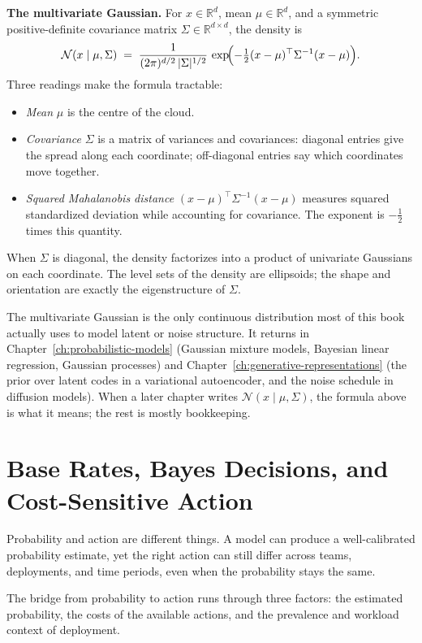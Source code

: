 \textbf{The multivariate Gaussian.} For \(x \in \mathbb{R}^d\), mean \(\mu \in \mathbb{R}^d\), and a symmetric positive-definite covariance matrix \(\Sigma \in \mathbb{R}^{d \times d}\), the density is
\[
\mathcal{N}(x \mid \mu, \Sigma) \;=\; \frac{1}{(2\pi)^{d/2}\,|\Sigma|^{1/2}}\,\exp\!\Bigl(-\tfrac{1}{2}(x-\mu)^\top \Sigma^{-1}(x-\mu)\Bigr).
\]
Three readings make the formula tractable:
\begin{itemize}[leftmargin=*]
\item \emph{Mean} \(\mu\) is the centre of the cloud.
\item \emph{Covariance} \(\Sigma\) is a matrix of variances and covariances: diagonal entries give the spread along each coordinate; off-diagonal entries say which coordinates move together.
\item \emph{Squared Mahalanobis distance} \((x-\mu)^\top \Sigma^{-1}(x-\mu)\) measures squared standardized deviation while accounting for covariance. The exponent is \(-\tfrac{1}{2}\) times this quantity.
\end{itemize}
When \(\Sigma\) is diagonal, the density factorizes into a product of univariate Gaussians on each coordinate. The level sets of the density are ellipsoids; the shape and orientation are exactly the eigenstructure of \(\Sigma\).

The multivariate Gaussian is the only continuous distribution most of this book actually uses to model latent or noise structure. It returns in Chapter~\ref{ch:probabilistic-models} (Gaussian mixture models, Bayesian linear regression, Gaussian processes) and Chapter~\ref{ch:generative-representations} (the prior over latent codes in a variational autoencoder, and the noise schedule in diffusion models). When a later chapter writes \(\mathcal{N}(x \mid \mu, \Sigma)\), the formula above is what it means; the rest is mostly bookkeeping.

\section*{Base Rates, Bayes Decisions, and Cost-Sensitive Action}

Probability and action are different things. A model can produce a well-calibrated probability estimate, yet the right action can still differ across teams, deployments, and time periods, even when the probability stays the same.

The bridge from probability to action runs through three factors: the estimated probability, the costs of the available actions, and the prevalence and workload context of deployment.

